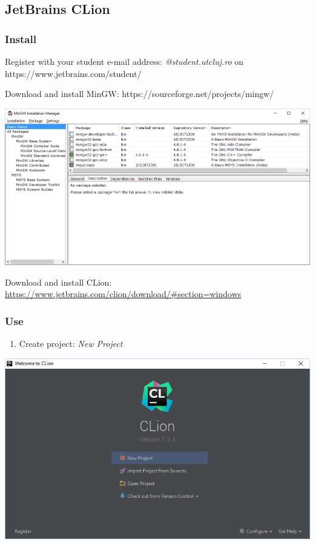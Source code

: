 \documentclass[../en-fa-lab.tex]{subfiles}
\begin{document}
\subsection{JetBrains CLion}\label{jetbrains-clion}

\subsubsection{Install}\label{install-1}

Register with your student e-mail address: \emph{@student.utcluj.ro} on
https://www.jetbrains.com/student/

Download and install MinGW: https://sourceforge.net/projects/mingw/

\includegraphics[width=\textwidth]{../Resources/lab0/image7.png}

Download and install CLion:
\url{https://www.jetbrains.com/clion/download/\#section=windows}

\subsubsection{Use}\label{use-1}

\begin{enumerate}
\def\labelenumi{\arabic{enumi}.}
\item
  Create project: \emph{New Project}
\end{enumerate}

\includegraphics[width=\textwidth]{../Resources/lab0/image8.png}
\end{document}

